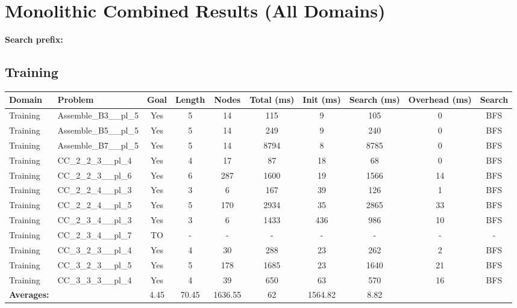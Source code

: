 \documentclass{article}
\begin{document}
\section*{Monolithic Combined Results (All Domains)}
\textbf{Search prefix:} 
\\[0.5cm]
\subsection*{Training}
\begin{landscape}
\begin{tabular}{llcccccccc}
\toprule
Domain & Problem & Goal & Length & Nodes & Total (ms) & Init (ms) & Search (ms) & Overhead (ms) & Search \\
\midrule
Training & Assemble\_B3\_\_pl\_5 & Yes & 5 & 14 & 115 & 9 & 105 & 0 & BFS \\
Training & Assemble\_B5\_\_pl\_5 & Yes & 5 & 14 & 249 & 9 & 240 & 0 & BFS \\
Training & Assemble\_B7\_\_pl\_5 & Yes & 5 & 14 & 8794 & 8 & 8785 & 0 & BFS \\
Training & CC\_2\_2\_3\_\_pl\_4 & Yes & 4 & 17 & 87 & 18 & 68 & 0 & BFS \\
Training & CC\_2\_2\_3\_\_pl\_6 & Yes & 6 & 287 & 1600 & 19 & 1566 & 14 & BFS \\
Training & CC\_2\_2\_4\_\_pl\_3 & Yes & 3 & 6 & 167 & 39 & 126 & 1 & BFS \\
Training & CC\_2\_2\_4\_\_pl\_5 & Yes & 5 & 170 & 2934 & 35 & 2865 & 33 & BFS \\
Training & CC\_2\_3\_4\_\_pl\_3 & Yes & 3 & 6 & 1433 & 436 & 986 & 10 & BFS \\
Training & CC\_2\_3\_4\_\_pl\_7 & TO & - & - & - & - & - & - & - \\
Training & CC\_3\_2\_3\_\_pl\_4 & Yes & 4 & 30 & 288 & 23 & 262 & 2 & BFS \\
Training & CC\_3\_2\_3\_\_pl\_5 & Yes & 5 & 178 & 1685 & 23 & 1640 & 21 & BFS \\
Training & CC\_3\_3\_3\_\_pl\_4 & Yes & 4 & 39 & 650 & 63 & 570 & 16 & BFS \\
\textbf{Averages:} & & 4.45 & 70.45 & 1636.55 & 62 & 1564.82 & 8.82 & \\
\bottomrule
\end{tabular}
\end{landscape}
\newpage
\end{document}

